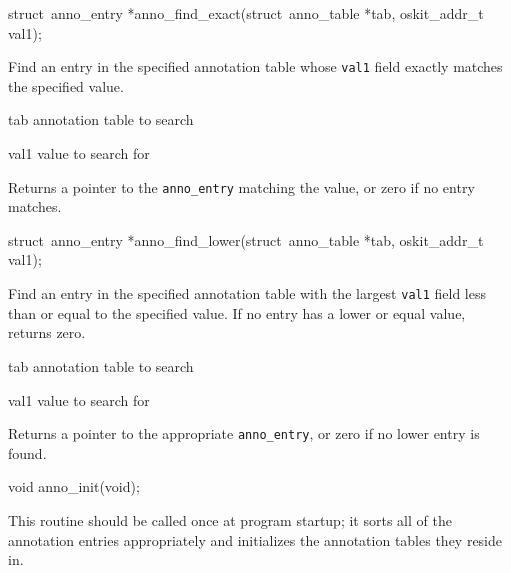 \label{anno-find-exact}
\begin{apisyn}

	\funcproto struct~anno_entry *anno_find_exact(struct~anno_table *tab,
		oskit_addr_t val1);
\end{apisyn}
\begin{apidesc}
	Find an entry in the specified annotation table whose {\tt val1}
	field exactly matches the specified value.
\end{apidesc}
\begin{apiparm}
	\item[tab]
		annotation table to search
	\item[val1]
		value to search for
\end{apiparm}
\begin{apiret}
	Returns a pointer to the {\tt anno_entry} matching the value,
	or zero if no entry matches.
\end{apiret}

\label{anno-find-lower}
\begin{apisyn}

	\funcproto struct~anno_entry *anno_find_lower(struct~anno_table *tab,
		oskit_addr_t val1);
\end{apisyn}
\begin{apidesc}
	Find an entry in the specified annotation table with the largest
	{\tt val1} field less than or equal to the specified value.
	If no entry has a lower or equal value, returns zero.
\end{apidesc}
\begin{apiparm}
	\item[tab]
		annotation table to search
	\item[val1]
		value to search for
\end{apiparm}
\begin{apiret}
	Returns a pointer to the appropriate {\tt anno_entry},
	or zero if no lower entry is found.
\end{apiret}

\label{anno-init}
\begin{apisyn}

	\funcproto void anno_init(void);
\end{apisyn}
\begin{apidesc}
	This routine should be called once at program startup;
	it sorts all of the annotation entries appropriately
	and initializes the annotation tables they reside in.
\end{apidesc}

